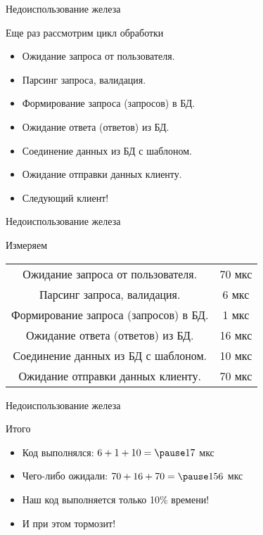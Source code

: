 \documentclass[aspectratio=169]{beamer}
\begin{document}
\begin{frame}{Недоиспользование железа}
    \begin{block}{Еще раз рассмотрим цикл обработки}
        \begin{itemize}
            \pause\item Ожидание запроса от пользователя.
            \pause\item Парсинг запроса, валидация.
            \pause\item Формирование запроса (запросов) в БД.
            \pause\item Ожидание ответа (ответов) из БД.
            \pause\item Соединение данных из БД с шаблоном.
            \pause\item Ожидание отправки данных клиенту.
        \end{itemize}
        
        \begin{itemize}
            \pause\item Следующий клиент!
        \end{itemize}
    \end{block}
\end{frame}

\begin{frame}{Недоиспользование железа}
    \begin{block}{Измеряем}
        \begin{tabular}{ c c }
            \pause Ожидание запроса от пользователя. & 70 мкс \\
            \pause Парсинг запроса, валидация.  & 6 мкс \\
            \pause Формирование запроса (запросов) в БД. & 1 мкс \\
            \pause Ожидание ответа (ответов) из БД. & 16 мкс \\
            \pause Соединение данных из БД с шаблоном. & 10 мкс\\
            \pause Ожидание отправки данных клиенту. & 70 мкс \\
        \end{tabular}
    \end{block}
\end{frame}

\begin{frame}{Недоиспользование железа}
    \begin{block}{Итого}
        \begin{itemize}
            \item Код выполнялся: $6 + 1 + 10 = \pause17$ мкс
            \pause\item Чего-либо ожидали: $70 + 16 + 70 = \pause156$ мкс
            \pause\item {\large Наш код выполняется только 10\% времени!}
            \pause\item И при этом тормозит!
        \end{itemize}
    \end{block}
\end{frame}
\end{document}
